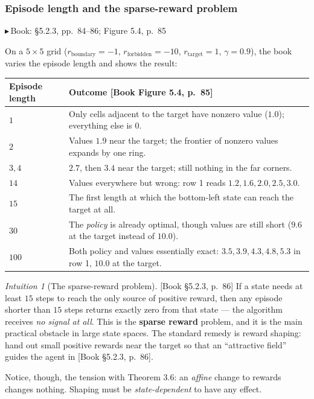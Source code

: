 \documentclass[11pt, letterpaper]{article}
\theoremstyle{runin}
\theoremstyle{runinplain}
\theoremstyle{remark}
\newtheorem*{intuition}{Intuition}
\newcommand{\bk}[1]{{\color{bookblue}\small$\blacktriangleright$\,\textsf{Book: #1}}}
\newcommand{\bkin}[1]{{\color{bookblue}\small[\textsf{Book #1}]}}
\begin{document}
\subsubsection{Episode length and the sparse-reward problem}

\bk{\S5.2.3, pp.~84--86; Figure 5.4, p.~85}

On a $5\times5$ grid ($r_{\text{boundary}}=-1$, $r_{\text{forbidden}}=-10$,
$r_{\text{target}}=1$, $\gamma=0.9$), the book varies the episode length and shows
the result:

\begin{center}
\small
\begin{tabular}{@{}lp{}@{}}
\toprule
Episode length & Outcome \bkin{Figure 5.4, p.~85} \\
\midrule
$1$   & Only cells adjacent to the target have nonzero value ($1.0$); everything else is $0$. \\
$2$   & Values $1.9$ near the target; the frontier of nonzero values expands by one ring. \\
$3,4$ & $2.7$, then $3.4$ near the target; still nothing in the far corners. \\
$14$  & Values everywhere but wrong: row 1 reads $1.2,1.6,2.0,2.5,3.0$. \\
$15$  & The first length at which the bottom-left state can reach the target at all. \\
$30$  & The \emph{policy} is already optimal, though values are still short ($9.6$ at the target instead of $10.0$). \\
$100$ & Both policy and values essentially exact: $3.5,3.9,4.3,4.8,5.3$ in row 1, $10.0$ at the target. \\
\bottomrule
\end{tabular}
\end{center}

\begin{intuition}[The sparse-reward problem]
\bkin{\S5.2.3, p.~86} If a state needs at least $15$ steps to reach the only source
of positive reward, then any episode shorter than $15$ steps returns exactly zero
from that state --- the algorithm receives \emph{no signal at all}. This is the
\textbf{sparse reward} problem, and it is the main practical obstacle in large state
spaces. The standard remedy is reward shaping: hand out small positive rewards near
the target so that an ``attractive field'' guides the agent in
\bkin{\S5.2.3, p.~86}.

Notice, though, the tension with Theorem 3.6: an \emph{affine} change to rewards
changes nothing. Shaping must be \emph{state-dependent} to have any effect.
\end{intuition}
\end{document}
